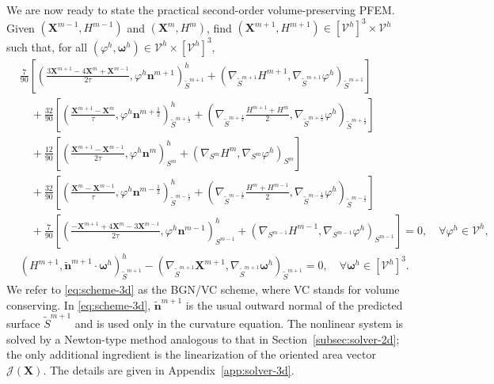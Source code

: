 \documentclass[smallextended]{svjour3}
\numberwithin{equation}{section}
\begin{document}
	We are now ready to state the practical second-order volume-preserving PFEM. Given $(\mathbf{X}^{m-1},H^{m-1})$ and $(\mathbf{X}^{m},H^{m})$, find
	$(\mathbf{X}^{m+1},H^{m+1})\in[\mathcal V^h]^3\times\mathcal V^h$ such that, for all
	$(\varphi^h,\boldsymbol{\omega}^h)\in\mathcal V^h\times[\mathcal V^h]^3$,
	\begin{subequations}
		\label{eq:scheme-3d}
		\begin{align}
			&
			\frac{7}{90}\left[
			\left(
			\frac{3\mathbf{X}^{m+1}-4\mathbf{X}^{m}+\mathbf{X}^{m-1}}{2\tau},
			\varphi^h\mathbf{n}^{m+1}
			\right)^h_{\widetilde{S}^{m+1}}
			+
			\left(
			\nabla_{\widetilde{S}^{m+1}}H^{m+1},
			\nabla_{\widetilde{S}^{m+1}}\varphi^h
			\right)_{\widetilde{S}^{m+1}}
			\right]
			\nonumber\\
			&\quad
			+\frac{32}{90}\left[
			\left(
			\frac{\mathbf{X}^{m+1}-\mathbf{X}^{m}}{\tau},
			\varphi^h\mathbf{n}^{m+\frac12}
			\right)^h_{\widetilde{S}^{m+\frac12}}
			+
			\left(
			\nabla_{\widetilde{S}^{m+\frac12}}\frac{H^{m+1}+H^{m}}{2},
			\nabla_{\widetilde{S}^{m+\frac12}}\varphi^h
			\right)_{\widetilde{S}^{m+\frac12}}
			\right]
			\nonumber\\
			&\quad
			+\frac{12}{90}\left[
			\left(
			\frac{\mathbf{X}^{m+1}-\mathbf{X}^{m-1}}{2\tau},
			\varphi^h\mathbf{n}^{m}
			\right)^h_{S^{m}}
			+
			\left(
			\nabla_{S^{m}}H^{m},
			\nabla_{S^{m}}\varphi^h
			\right)_{S^{m}}
			\right]
			\nonumber\\
			&\quad
			+\frac{32}{90}\left[
			\left(
			\frac{\mathbf{X}^{m}-\mathbf{X}^{m-1}}{\tau},
			\varphi^h\mathbf{n}^{m-\frac12}
			\right)^h_{\widetilde{S}^{m-\frac12}}
			+
			\left(
			\nabla_{\widetilde{S}^{m-\frac12}}\frac{H^{m}+H^{m-1}}{2},
			\nabla_{\widetilde{S}^{m-\frac12}}\varphi^h
			\right)_{\widetilde{S}^{m-\frac12}}
			\right]
			\nonumber\\
			&\quad
			+\frac{7}{90}\left[
			\left(
			\frac{-\mathbf{X}^{m+1}+4\mathbf{X}^{m}-3\mathbf{X}^{m-1}}{2\tau},
			\varphi^h\mathbf{n}^{m-1}
			\right)^h_{S^{m-1}}
			+
			\left(
			\nabla_{S^{m-1}}H^{m-1},
			\nabla_{S^{m-1}}\varphi^h
			\right)_{S^{m-1}}
			\right]
			=0,
			\quad \forall \varphi^h\in\mathcal V^h,
			\label{eq:scheme-3d-a}
			\\
			&
			\left(
			H^{m+1},
			\widetilde{\mathbf{n}}^{m+1}\cdot\boldsymbol{\omega}^h
			\right)^h_{\widetilde{S}^{m+1}}
			-
			\left(
			\nabla_{\widetilde{S}^{m+1}}\mathbf{X}^{m+1},
			\nabla_{\widetilde{S}^{m+1}}\boldsymbol{\omega}^h
			\right)_{\widetilde{S}^{m+1}}
			=0,
			\quad \forall \boldsymbol{\omega}^h\in[\mathcal V^h]^3.
			\label{eq:scheme-3d-b}
		\end{align}
	\end{subequations}
	We refer to \eqref{eq:scheme-3d} as the BGN/VC scheme, where VC stands for volume conserving. In \eqref{eq:scheme-3d}, $\widetilde{\mathbf{n}}^{m+1}$ is the usual outward normal of the predicted surface $\widetilde{S}^{m+1}$ and is used only in the curvature equation. The nonlinear system is solved by a Newton-type method analogous to that in Section~\ref{subsec:solver-2d}; the only additional ingredient is the linearization of the oriented area vector $\mathcal{J}(\mathbf{X})$. The details are given in Appendix~\ref{app:solver-3d}.
	
\end{document}
